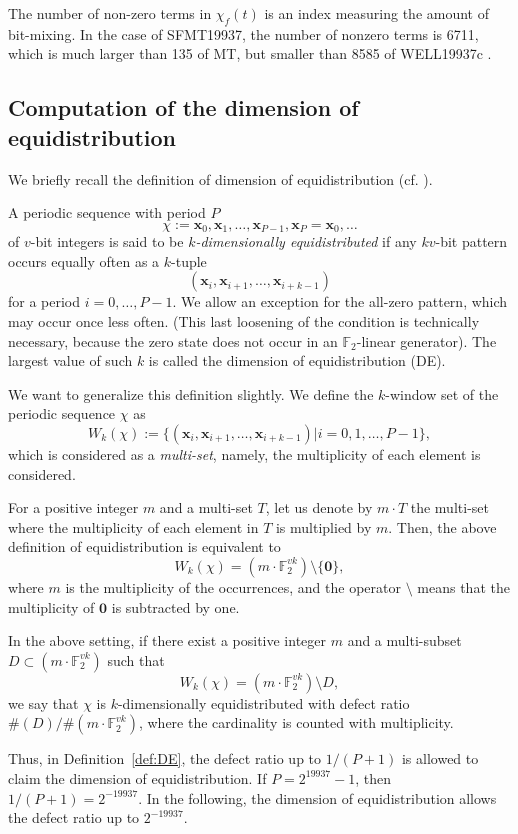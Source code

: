 \documentclass{svmult}
\def\F2{{\mathbb F}_2}
\def\bx{{{\mathbf x}}}
\begin{document}
\begin{remark}
The number of non-zero terms in $\chi_f(t)$ is 
an index measuring the amount of bit-mixing. 
In the case of SFMT19937, the number of nonzero 
terms is 6711, which is much larger than 135 of MT, 
but smaller than 8585 of WELL19937c \cite{WELL}. 
\end{remark}

\subsection{Computation of the dimension of equidistribution}
\label{sec:DE}
We briefly recall the definition of dimension of 
equidistribution (cf. \cite{CLT}\cite{COMBTAUS}). 
\begin{definition}\label{def:DE}
A periodic sequence with period $P$
$$\chi:=\bx_0, \bx_1, \ldots, \bx_{P-1}, \bx_P=\bx_0, \ldots$$
of $v$-bit integers is said to be {\em $k$-dimensionally equidistributed}
if any $kv$-bit pattern occurs equally often as a $k$-tuple
$$
(\bx_i, \bx_{i+1}, \ldots, \bx_{i+k-1})
$$
for a period $i=0,\ldots, P-1$.
We allow an exception for 
the all-zero pattern, which may occur once less often.
(This last loosening of the condition is technically
necessary, because the zero state does not occur
in an $\F2$-linear generator). 
The largest value of such $k$ is called the dimension 
of equidistribution (DE).
\end{definition}

We want to generalize this definition slightly.
We define the $k$-window set of the periodic sequence $\chi$
as
$$
W_k(\chi):=
\{(\bx_i, \bx_{i+1}, \ldots, \bx_{i+k-1}) | 
i =0,1,\ldots, P-1\},
$$
which is considered as a {\em multi-set}, namely, 
the multiplicity of each element is considered. 

For a positive integer $m$ and a multi-set $T$,
let us denote by $m \cdot T$ the multi-set 
where the multiplicity of each element in $T$ is
multiplied by $m$. Then, the above definition of
equidistribution is equivalent to 
$$
W_k(\chi)=(m\cdot \F2^{vk}) \setminus \{{\mathbf 0}\},
$$
where $m$ is the multiplicity of the occurrences,
and the operator $\setminus$ means that the multiplicity
of ${\mathbf 0}$ is subtracted by one. 

\begin{definition}
In the above setting, if there exist a positive integer $m$ 
and a multi-subset
$D \subset (m\cdot \F2^{vk})$
such that
$$
W_k(\chi)=(m\cdot \F2^{vk}) \setminus D,
$$
we say that $\chi$ is $k$-dimensionally equidistributed 
with defect ratio $\#(D)/\#(m \cdot \F2^{vk})$, 
where the cardinality is counted with multiplicity. 
\end{definition}
Thus, in Definition~\ref{def:DE}, the defect ratio up to $1/(P+1)$
is allowed to claim the dimension of equidistribution.
If $P=2^{19937}-1$, then $1/(P+1)=2^{-19937}$. 
In the following, the dimension of equidistribution 
allows the defect ratio up to $2^{-19937}$. 
\end{document}
